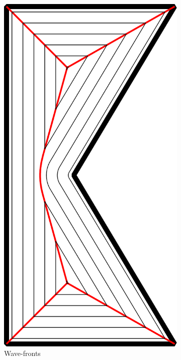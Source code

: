 \begin{figure}
\begin{subfigure}{0.3\columnwidth}
\includegraphics[height=1.5\columnwidth]{sources/method/MAT_explanation_wavefronts.pdf}
\caption{Wave-fronts}
\end{subfigure}
\begin{subfigure}{0.3\columnwidth}
\centering

\end{subfigure}
\end{figure}
